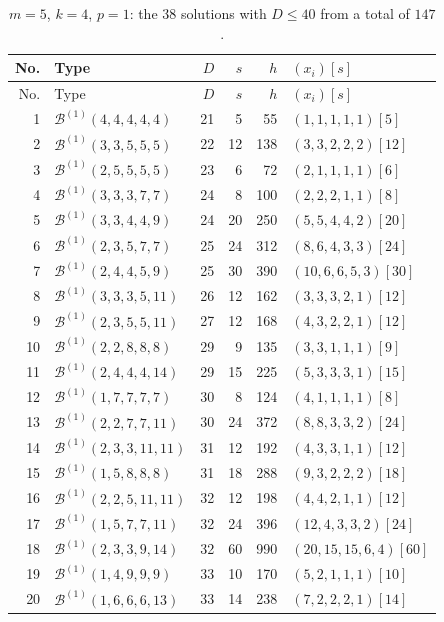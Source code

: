 \documentclass[11pt,a4paper]{article}
\newcommand{\Ber}{\mathcal B}
\theoremstyle{definition}
\theoremstyle{plain}
\begin{document}
\begin{longtable}{@{}r l r r r l@{}}
\caption{$m=5$, $k=4$, $p=1$: the $38$ solutions with $D\leq40$ from a total of $147$.}\label{tab:m5p1}\\
\toprule
No. & Type & $D$ & $s$ & $h$ & $(x_i)[s]$\\
\midrule
\endfirsthead
\toprule
No. & Type & $D$ & $s$ & $h$ & $(x_i)[s]$\\
\midrule
\endhead
1 & $\Ber^{(1)}(4,4,4,4,4)$ & 21 & 5 & 55 & $(1,1,1,1,1)[5]$ \\
2 & $\Ber^{(1)}(3,3,5,5,5)$ & 22 & 12 & 138 & $(3,3,2,2,2)[12]$ \\
3 & $\Ber^{(1)}(2,5,5,5,5)$ & 23 & 6 & 72 & $(2,1,1,1,1)[6]$ \\
4 & $\Ber^{(1)}(3,3,3,7,7)$ & 24 & 8 & 100 & $(2,2,2,1,1)[8]$ \\
5 & $\Ber^{(1)}(3,3,4,4,9)$ & 24 & 20 & 250 & $(5,5,4,4,2)[20]$ \\
6 & $\Ber^{(1)}(2,3,5,7,7)$ & 25 & 24 & 312 & $(8,6,4,3,3)[24]$ \\
7 & $\Ber^{(1)}(2,4,4,5,9)$ & 25 & 30 & 390 & $(10,6,6,5,3)[30]$ \\
8 & $\Ber^{(1)}(3,3,3,5,11)$ & 26 & 12 & 162 & $(3,3,3,2,1)[12]$ \\
9 & $\Ber^{(1)}(2,3,5,5,11)$ & 27 & 12 & 168 & $(4,3,2,2,1)[12]$ \\
10 & $\Ber^{(1)}(2,2,8,8,8)$ & 29 & 9 & 135 & $(3,3,1,1,1)[9]$ \\
11 & $\Ber^{(1)}(2,4,4,4,14)$ & 29 & 15 & 225 & $(5,3,3,3,1)[15]$ \\
12 & $\Ber^{(1)}(1,7,7,7,7)$ & 30 & 8 & 124 & $(4,1,1,1,1)[8]$ \\
13 & $\Ber^{(1)}(2,2,7,7,11)$ & 30 & 24 & 372 & $(8,8,3,3,2)[24]$ \\
14 & $\Ber^{(1)}(2,3,3,11,11)$ & 31 & 12 & 192 & $(4,3,3,1,1)[12]$ \\
15 & $\Ber^{(1)}(1,5,8,8,8)$ & 31 & 18 & 288 & $(9,3,2,2,2)[18]$ \\
16 & $\Ber^{(1)}(2,2,5,11,11)$ & 32 & 12 & 198 & $(4,4,2,1,1)[12]$ \\
17 & $\Ber^{(1)}(1,5,7,7,11)$ & 32 & 24 & 396 & $(12,4,3,3,2)[24]$ \\
18 & $\Ber^{(1)}(2,3,3,9,14)$ & 32 & 60 & 990 & $(20,15,15,6,4)[60]$ \\
19 & $\Ber^{(1)}(1,4,9,9,9)$ & 33 & 10 & 170 & $(5,2,1,1,1)[10]$ \\
20 & $\Ber^{(1)}(1,6,6,6,13)$ & 33 & 14 & 238 & $(7,2,2,2,1)[14]$ \\

\end{longtable}
\end{document}
